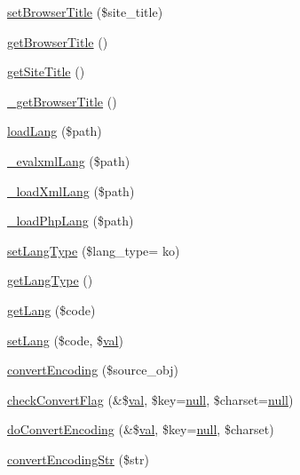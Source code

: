 \begin{DoxyCompactItemize}
\hyperlink{classContext_aab07bc95a7a855c4d9608b4ed615807f}{set\+Browser\+Title} (\$site\+\_\+title)
\item 
\hyperlink{classContext_a19f432349a41af2ed36b2cd5e6ba96a5}{get\+Browser\+Title} ()
\item 
\hyperlink{classContext_a0ee79330d3ee12c811cd784e24a7b017}{get\+Site\+Title} ()
\item 
\hyperlink{classContext_ab8f518a596abcbbd70b20dd46442ae0a}{\+\_\+get\+Browser\+Title} ()
\item 
\hyperlink{classContext_a7b22a741ff804e5cdaafd952273bd70c}{load\+Lang} (\$path)
\item 
\hyperlink{classContext_a45bd19b6edf9e66582842a3f6e50fa4b}{\+\_\+evalxml\+Lang} (\$path)
\item 
\hyperlink{classContext_af3ba6aaa8fa5f6c758b7716ec7135ab3}{\+\_\+load\+Xml\+Lang} (\$path)
\item 
\hyperlink{classContext_a3ad6fc7782e7234fe77357da28218310}{\+\_\+load\+Php\+Lang} (\$path)
\item 
\hyperlink{classContext_ad70a3a0db09c75a9eb20e8f5f1df305f}{set\+Lang\+Type} (\$lang\+\_\+type= \textquotesingle{}ko\textquotesingle{})
\item 
\hyperlink{classContext_ae75d6f4064d09e48d0d76614b6997e29}{get\+Lang\+Type} ()
\item 
\hyperlink{classContext_a9af9269b04542f7462d27a63226e0ff3}{get\+Lang} (\$code)
\item 
\hyperlink{classContext_a3615e0bc64da445f6165e97785c7d94c}{set\+Lang} (\$code, \$\hyperlink{ckeditor_2js_2xe__interface_8js_a4fb96abdf073a439bca5e051c333b35d}{val})
\item 
\hyperlink{classContext_a9ef4f41a9ae7108ea7560162399c77a8}{convert\+Encoding} (\$source\+\_\+obj)
\item 
\hyperlink{classContext_ac2bf2f97195aae6b2cd6ba559bbcb18f}{check\+Convert\+Flag} (\&\$\hyperlink{ckeditor_2js_2xe__interface_8js_a4fb96abdf073a439bca5e051c333b35d}{val}, \$key=\hyperlink{modernizr_8min_8js_a286f9ec831c5e676eeb493248eab9575}{null}, \$charset=\hyperlink{modernizr_8min_8js_a286f9ec831c5e676eeb493248eab9575}{null})
\item 
\hyperlink{classContext_ade825b985221f5bef69919e30e9ed248}{do\+Convert\+Encoding} (\&\$\hyperlink{ckeditor_2js_2xe__interface_8js_a4fb96abdf073a439bca5e051c333b35d}{val}, \$key=\hyperlink{modernizr_8min_8js_a286f9ec831c5e676eeb493248eab9575}{null}, \$charset)
\item 
\hyperlink{classContext_a0464dcbadfd67f62265fac90546d3bf8}{convert\+Encoding\+Str} (\$str)

\end{DoxyCompactItemize}
